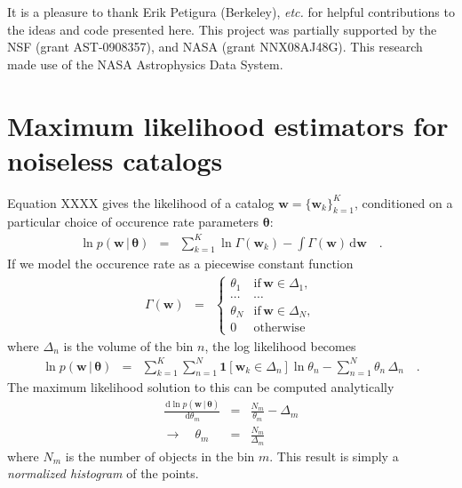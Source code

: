 \documentclass[12pt,preprint]{aastex}
\newcommand{\project}[1]{{\sffamily #1}}
\newcommand{\foreign}[1]{\emph{#1}}
\newcommand{\etc}{\foreign{etc.}}
\newcommand{\sectlabel}[1]{\label{sect:#1}}
\newcommand{\dd}{\ensuremath{\,\mathrm{d}}}
\newcommand{\bvec}[1]{\ensuremath{\boldsymbol{#1}}}
\newcommand{\rate}{\ensuremath{\Gamma}}
\newcommand{\ratepar}{{\ensuremath{\theta}}}
\newcommand{\ratepars}{{\ensuremath{\bvec{\ratepar}}}}
\newcommand{\entry}{{\ensuremath{\bvec{w}}}}
\newcommand{\catalog}{{\ensuremath{\bvec{\entry}}}}
\newcommand{\binarea}{{\ensuremath{\Delta}}}
\begin{document}
\acknowledgments
It is a pleasure to thank
    Erik Petigura (Berkeley),
    \etc
for helpful contributions to the ideas and code presented here.
This project was partially supported by the NSF (grant AST-0908357), and NASA
(grant NNX08AJ48G).
This research made use of the NASA \project{Astrophysics Data System}.

\appendix

\section{Maximum likelihood estimators for noiseless catalogs}
\sectlabel{histogram}

Equation XXXX gives the likelihood of a catalog $\catalog =
\{\entry_k\}_{k=1}^K$, conditioned on a particular choice of occurence rate
parameters \ratepars:
\begin{eqnarray}
\ln p(\catalog\,|\,\ratepars) &=& \sum_{k=1}^K \ln \rate(\entry_k)
    - \int \rate(\entry) \dd\entry \quad.
\end{eqnarray}
If we model the occurence rate as a piecewise constant function
\begin{eqnarray}
\rate (\entry) &=& \left \{\begin{array}{ll}
\ratepar_1 & \mathrm{if\,} \entry \in \binarea_1, \\
\cdots & \cdots \\
\ratepar_N & \mathrm{if\,} \entry \in \binarea_N, \\
0 & \mathrm{otherwise}
\end{array}\right.
\end{eqnarray}
where $\binarea_n$ is the volume of the bin $n$, the log likelihood becomes
\begin{eqnarray}
\ln p(\catalog\,|\,\ratepars) &=&
    \sum_{k=1}^K \sum_{n=1}^N \mathbf{1}[\entry_k \in \binarea_n]
        \ln\ratepar_n
    - \sum_{n=1}^N \ratepar_n\,\binarea_n \quad.
\end{eqnarray}
The maximum likelihood solution to this can be computed analytically
\begin{eqnarray}
\frac{\dd \ln p(\catalog\,|\,\ratepars)}{\dd \ratepar_m} &=&
    \frac{N_m}{\ratepar_m} - \binarea_m \\
\to \quad \ratepar_m &=& \frac{N_m}{\binarea_m}
\end{eqnarray}
where $N_m$ is the number of objects in the bin $m$.
This result is simply a \emph{normalized histogram} of the points.
\end{document}
